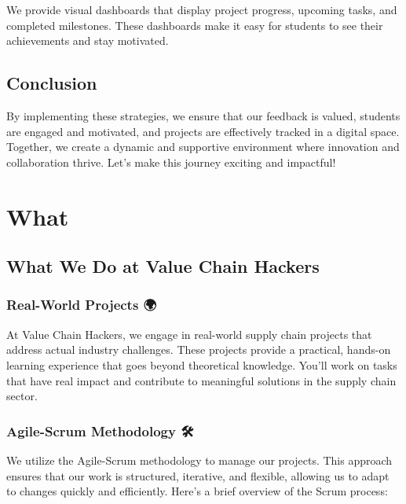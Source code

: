 \documentclass[
  letterpaper,
  DIV=11,
  numbers=noendperiod]{scrreprt}
\begin{document}
We provide visual dashboards that display project progress, upcoming
tasks, and completed milestones. These dashboards make it easy for
students to see their achievements and stay motivated.

\section{Conclusion}\label{conclusion-1}

By implementing these strategies, we ensure that our feedback is valued,
students are engaged and motivated, and projects are effectively tracked
in a digital space. Together, we create a dynamic and supportive
environment where innovation and collaboration thrive. Let's make this
journey exciting and impactful! 🚀


\chapter{What}\label{what}

\section{What We Do at Value Chain
Hackers}\label{what-we-do-at-value-chain-hackers}

\subsection{Real-World Projects 🌍}\label{real-world-projects}

At Value Chain Hackers, we engage in real-world supply chain projects
that address actual industry challenges. These projects provide a
practical, hands-on learning experience that goes beyond theoretical
knowledge. You'll work on tasks that have real impact and contribute to
meaningful solutions in the supply chain sector.

\subsection{Agile-Scrum Methodology 🛠️}\label{agile-scrum-methodology}

We utilize the Agile-Scrum methodology to manage our projects. This
approach ensures that our work is structured, iterative, and flexible,
allowing us to adapt to changes quickly and efficiently. Here's a brief
overview of the Scrum process:
\end{document}
